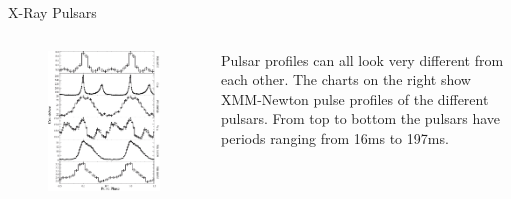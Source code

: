 \documentclass[12pt, aspectratio=169]{beamer}
\begin{document}
\begin{frame}{X-Ray Pulsars}
  
\begin{columns}
             \centering
               \begin{figure}
                 \includegraphics[width=\textwidth]{pulsars.png}
               \end{figure}

           Pulsar profiles can all look very different from each other. The charts on the right show XMM-Newton pulse profiles of the different pulsars. From top to bottom the pulsars have periods ranging from 16ms to 197ms.

         \end{columns} 

\end{frame}
\end{document}
